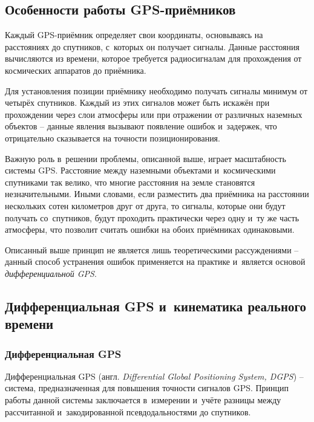 
\subsection{Особенности работы GPS-приёмников}

Каждый GPS-приёмник определяет свои координаты, основываясь на расстояниях до спутников, с~которых он получает сигналы. Данные расстояния вычисляются из времени, которое требуется радиосигналам для прохождения от космических аппаратов до приёмника. \par

Для установления позиции приёмнику необходимо получать сигналы минимум от четырёх спутников. Каждый из этих сигналов может быть искажён при прохождении через слои атмосферы или при отражении от различных наземных объектов -- данные явления вызывают появление ошибок и~задержек, что отрицательно сказывается на точности позиционирования. \par

Важную роль в~решении проблемы, описанной выше, играет масштабность системы GPS. Расстояние между наземными объектами и~космическими спутниками так велико, что многие расстояния на земле становятся незначительными. Иными словами, если разместить два приёмника на расстоянии нескольких сотен километров друг от друга, то сигналы, которые они будут получать со~спутников, будут проходить практически через одну и~ту же часть атмосферы, что позволит считать ошибки на обоих приёмниках одинаковыми. \par

Описанный выше принцип не является лишь теоретическими рассуждениями -- данный способ устранения ошибок применяется на практике и~является основой \emph{дифференциальной GPS}.

\subsection{Дифференциальная GPS и~кинематика реального времени}

\subsubsection{Дифференциальная GPS}

Дифференциальная GPS (англ. \emph{Differential Global Positioning System, DGPS}) -- система, предназначенная для повышения точности сигналов GPS. Принцип работы данной системы заключается в~измерении и~учёте разницы между рассчитанной и~закодированной псевдодальностями до спутников. \par

